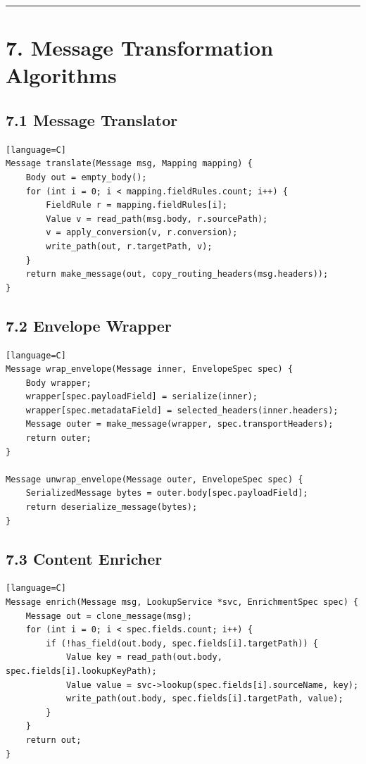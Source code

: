 \documentclass[11pt]{article}
\begin{document}
\begin{center}\rule{0.5\linewidth}{0.5pt}\end{center}

\section{7. Message Transformation
Algorithms}\label{message-transformation-algorithms}

\subsection{7.1 Message Translator}\label{message-translator}

\begin{verbatim}[language=C]
Message translate(Message msg, Mapping mapping) {
    Body out = empty_body();
    for (int i = 0; i < mapping.fieldRules.count; i++) {
        FieldRule r = mapping.fieldRules[i];
        Value v = read_path(msg.body, r.sourcePath);
        v = apply_conversion(v, r.conversion);
        write_path(out, r.targetPath, v);
    }
    return make_message(out, copy_routing_headers(msg.headers));
}
\end{verbatim}

\subsection{7.2 Envelope Wrapper}\label{envelope-wrapper}

\begin{verbatim}[language=C]
Message wrap_envelope(Message inner, EnvelopeSpec spec) {
    Body wrapper;
    wrapper[spec.payloadField] = serialize(inner);
    wrapper[spec.metadataField] = selected_headers(inner.headers);
    Message outer = make_message(wrapper, spec.transportHeaders);
    return outer;
}

Message unwrap_envelope(Message outer, EnvelopeSpec spec) {
    SerializedMessage bytes = outer.body[spec.payloadField];
    return deserialize_message(bytes);
}
\end{verbatim}

\subsection{7.3 Content Enricher}\label{content-enricher}

\begin{verbatim}[language=C]
Message enrich(Message msg, LookupService *svc, EnrichmentSpec spec) {
    Message out = clone_message(msg);
    for (int i = 0; i < spec.fields.count; i++) {
        if (!has_field(out.body, spec.fields[i].targetPath)) {
            Value key = read_path(out.body, spec.fields[i].lookupKeyPath);
            Value value = svc->lookup(spec.fields[i].sourceName, key);
            write_path(out.body, spec.fields[i].targetPath, value);
        }
    }
    return out;
}
\end{verbatim}
\end{document}
